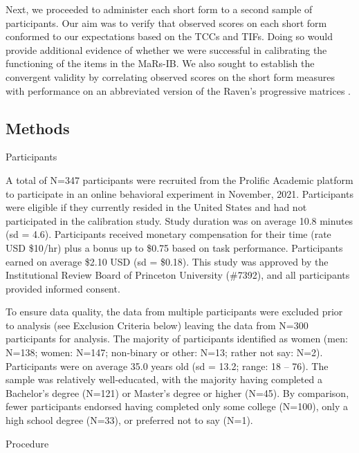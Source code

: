 \documentclass[a4paper,man,natbib]{apa6}
\makeatletter
\renewcommand{\subsubsection}{\@startsection{subsubsection}{3}
  {\z@}%
  {\b@level@two@skip}{\e@level@two@skip}%
  {\normalfont\normalsize\bfseries}}
\makeatother
\begin{document}
Next, we proceeded to administer each short form to a second sample of participants. Our aim was to verify that observed scores on each short form conformed to our expectations based on the TCCs and TIFs. Doing so would provide additional evidence of whether we were successful in calibrating the functioning of the items in the MaRs-IB. We also sought to establish the convergent validity by correlating observed scores on the short form measures with performance on an abbreviated version of the Raven's progressive matrices \citep{bilker2012development}.

\subsection{Methods}

\subsubsection{Participants}

A total of N=347 participants were recruited from the Prolific Academic platform to participate in an online behavioral experiment in November, 2021. Participants were eligible if they currently resided in the United States and had not participated in the calibration study. Study duration was on average 10.8 minutes (sd = 4.6). Participants received monetary compensation for their time (rate USD \$10/hr) plus a bonus up to \$0.75 based on task performance. Participants earned on average \$2.10 USD (sd = \$0.18). This study was approved by the Institutional Review Board of Princeton University (\#7392), and all participants provided informed consent. 

To ensure data quality, the data from multiple participants were excluded prior to analysis (see Exclusion Criteria below) leaving the data from N=300 participants for analysis. The majority of participants identified as women (men: N=138; women: N=147; non-binary or other: N=13; rather not say: N=2). Participants were on average 35.0 years old (sd = 13.2; range: 18 -- 76). The sample was relatively well-educated, with the majority having completed a Bachelor's degree (N=121) or Master's degree or higher (N=45). By comparison, fewer participants endorsed having completed only some college (N=100), only a high school degree (N=33), or preferred not to say (N=1). 

\subsubsection{Procedure}
\end{document}
